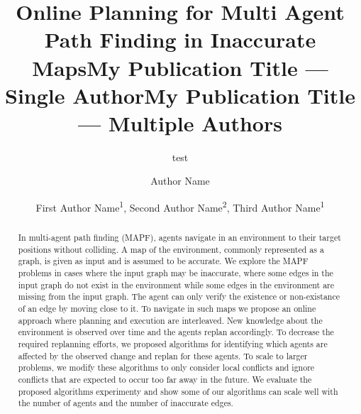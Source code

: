 \documentclass[letterpaper]{article} %
\title{Online Planning for Multi Agent Path Finding in Inaccurate Maps}
\author{
    test
}
\title{My Publication Title --- Single Author}
\author {
    Author Name
}
\title{My Publication Title --- Multiple Authors}
\author {
    First Author Name\textsuperscript{\rm 1},
    Second Author Name\textsuperscript{\rm 2},
    Third Author Name\textsuperscript{\rm 1}
}
\def\
UrlFont{\rm}  %
\newcommand{\nir}[1]{\textbf{[\color{blue}NIR:#1]}}
\newcommand{\commentout}[1]{}
\theoremstyle{definition}
\begin{document}
\maketitle

\begin{abstract}
In multi-agent path finding (MAPF), agents navigate in an environment to their target positions without colliding. A map of the environment, commonly represented as a graph, is given as input and is assumed to be accurate.
We explore the MAPF problems in cases where the input graph may be inaccurate, where some edges in the input graph do not exist in the environment while some edges in the environment are missing from the input graph.
The agent can only verify the existence or non-existance of an edge by moving close to it.
To navigate in such maps we propose an online approach where planning and execution are interleaved.
New knowledge about the environment is observed over time and the agents replan accordingly.
To decrease the required replanning efforts, we proposed algorithms for identifying which agents are affected by the observed change and replan for these agents.
To scale to larger problems, we modify these algorithms to only consider local conflicts and ignore conflicts that are expected to occur too far away in the future.
We evaluate the proposed algorithms experimenty and show some of our algorithms can scale well with the number of agents and the number of inaccurate edges.


\commentout{

}
\end{abstract}
\end{document}
